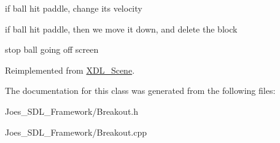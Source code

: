 if ball hit paddle, change its velocity

if ball hit paddle, then we move it down, and delete the block

stop ball going off screen 

Reimplemented from \hyperlink{class_x_d_l___scene_abd1ce8f1dbc90c4376c99ccd7fd9c024}{X\-D\-L\-\_\-\-Scene}.



The documentation for this class was generated from the following files\-:\begin{DoxyCompactItemize}
\item 
Joes\-\_\-\-S\-D\-L\-\_\-\-Framework/Breakout.\-h\item 
Joes\-\_\-\-S\-D\-L\-\_\-\-Framework/Breakout.\-cpp\end{DoxyCompactItemize}
